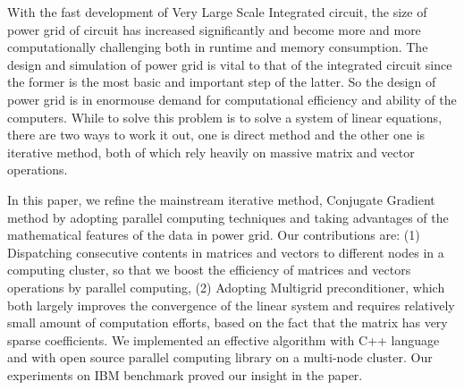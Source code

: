 \begin{eabstract}
   With the fast development of Very Large Scale Integrated circuit, the size of power grid of circuit has increased significantly and become
   more and more computationally challenging both in runtime and memory consumption. The design and simulation of power grid is vital to
   that of the integrated circuit since the former is the most basic and important step of the latter. So the design of power grid is in
   enormouse demand for computational efficiency and ability of the computers. While to solve this problem is to solve a system of linear
   equations, there are two ways to work it out, one is direct method and the other one is iterative method, both of which rely heavily on
   massive matrix and vector operations.

   In this paper, we refine the mainstream iterative method, Conjugate Gradient method by adopting parallel computing techniques and taking
   advantages of the mathematical features of the data in power grid. Our contributions are: (1) Dispatching consecutive contents in matrices
   and vectors to different nodes in a computing cluster, so that we boost the efficiency of matrices and vectors operations by parallel
   computing, (2) Adopting Multigrid preconditioner, which both largely improves the convergence of the linear system and requires relatively
   small amount of computation efforts, based on the fact that the matrix has very sparse coefficients. We implemented an effective algorithm
   with C++ language and with open source parallel computing library on a multi-node cluster. Our experiments on IBM benchmark proved our
   insight in the paper.
\end{eabstract}
